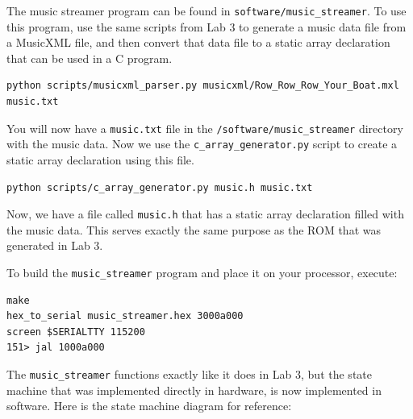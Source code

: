 \documentclass[11pt]{article}
\begin{document}
The music streamer program can be found in \verb|software/music_streamer|. To use this program, use the same scripts from Lab 3 to generate a music data file from a MusicXML file, and then convert that data file to a static array declaration that can be used in a C program.

\begin{verbatim}
python scripts/musicxml_parser.py musicxml/Row_Row_Row_Your_Boat.mxl music.txt
\end{verbatim}

You will now have a \verb|music.txt| file in the \verb|/software/music_streamer| directory with the music data. Now we use the \verb|c_array_generator.py| script to create a static array declaration using this file.

\begin{verbatim}
python scripts/c_array_generator.py music.h music.txt
\end{verbatim}

Now, we have a file called \verb|music.h| that has a static array declaration filled with the music data. This serves exactly the same purpose as the ROM that was generated in Lab 3.

To build the \verb|music_streamer| program and place it on your processor, execute:
\begin{verbatim}
make
hex_to_serial music_streamer.hex 3000a000
screen $SERIALTTY 115200
151> jal 1000a000
\end{verbatim}

The \verb|music_streamer| functions exactly like it does in Lab 3, but the state machine that was implemented directly in hardware, is now implemented in software. Here is the state machine diagram for reference:

\begin{center}
\end{center}
\end{document}
